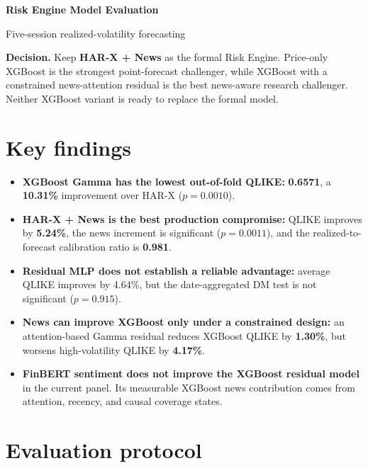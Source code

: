 \documentclass[10pt]{article}
\newcommand{\metric}[1]{\textbf{\textcolor{AuroraBlue}{#1}}}
\newcommand{\positive}[1]{\textbf{\textcolor{GoodGreen}{#1}}}
\newcommand{\negative}[1]{\textbf{\textcolor{WarnRed}{#1}}}
\begin{document}
{\LARGE\bfseries Risk Engine Model Evaluation}

\vspace{0.25em}
{\large Five-session realized-volatility forecasting}

\vspace{0.75em}
\colorbox{AuroraLight}{%
  \parbox{\dimexpr\textwidth-2\fboxsep\relax}{%
    \textbf{Decision.}
    Keep \textbf{HAR-X + News} as the formal Risk Engine.
    Price-only XGBoost is the strongest point-forecast challenger, while
    XGBoost with a constrained news-attention residual is the best
    news-aware research challenger. Neither XGBoost variant is ready to
    replace the formal model.
  }%
}

\section{Key findings}

\begin{itemize}
  \item \textbf{XGBoost Gamma has the lowest out-of-fold QLIKE:}
        \metric{0.6571}, a \metric{10.31\%} improvement over HAR-X
        (\(p=0.0010\)).
  \item \textbf{HAR-X + News is the best production compromise:}
        QLIKE improves by \metric{5.24\%}, the news increment is significant
        (\(p=0.0011\)), and the realized-to-forecast calibration ratio is
        \metric{0.981}.
  \item \textbf{Residual MLP does not establish a reliable advantage:}
        average QLIKE improves by 4.64\%, but the date-aggregated DM test is
        not significant (\(p=0.915\)).
  \item \textbf{News can improve XGBoost only under a constrained design:}
        an attention-based Gamma residual reduces XGBoost QLIKE by
        \positive{1.30\%}, but worsens high-volatility QLIKE by
        \negative{4.17\%}.
  \item \textbf{FinBERT sentiment does not improve the XGBoost residual model}
        in the current panel. Its measurable XGBoost news contribution comes
        from attention, recency, and causal coverage states.
\end{itemize}

\section{Evaluation protocol}
\end{document}

